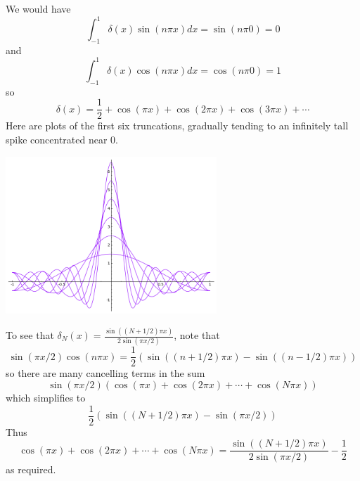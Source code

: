 \documentclass[12pt]{article}
\begin{document}
\begin{answer}
We would have
\[\int_{-1}^1\delta(x)\sin(n\pi x)dx=\sin(n\pi 0)=0\]
and
\[\int_{-1}^1\delta(x)\cos(n\pi x)dx=\cos(n\pi 0)=1\]
so
\[\delta(x)=\frac{1}{2}+\cos(\pi x)+\cos(2\pi x)+\cos(3\pi x)+\cdots\]
Here are plots of the first six truncations, gradually tending to an infinitely tall spike concentrated near 0.

\begin{center}\includegraphics[width=300px]{delta-all.png}\end{center}

To see that $\delta_N(x)=\frac{\sin((N+1/2)\pi x)}{2\sin(\pi x/2)}$, note that
\[\sin(\pi x/2)\cos(n\pi x)=\frac{1}{2}(\sin((n+1/2)\pi x)-\sin((n-1/2)\pi x))\]
so there are many cancelling terms in the sum
\[\sin(\pi x/2)(\cos(\pi x)+\cos(2\pi x)+\cdots+\cos(N\pi x))\]
which simplifies to
\[\frac{1}{2}(\sin((N+1/2)\pi x)-\sin(\pi x/2))\]
Thus
\[\cos(\pi x)+\cos(2\pi x)+\cdots+\cos(N\pi x)=\frac{\sin((N+1/2)\pi x)}{2\sin(\pi x/2)}-\frac{1}{2}\]
as required.
\end{answer}
\fi
\end{document}

